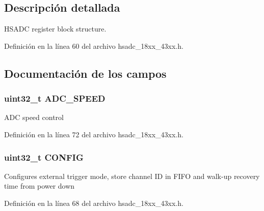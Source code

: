 \subsection{Descripción detallada}
H\+S\+A\+DC register block structure. 

Definición en la línea 60 del archivo hsadc\+\_\+18xx\+\_\+43xx.\+h.



\subsection{Documentación de los campos}
\subsubsection[{\texorpdfstring{A\+D\+C\+\_\+\+S\+P\+E\+ED}{ADC_SPEED}}]{ uint32\+\_\+t A\+D\+C\+\_\+\+S\+P\+E\+ED}\hypertarget{struct_l_p_c___h_s_a_d_c___t_a54d508ec691447ed4910f6bb5baf2caa}{}\label{struct_l_p_c___h_s_a_d_c___t_a54d508ec691447ed4910f6bb5baf2caa}
A\+DC speed control 

Definición en la línea 72 del archivo hsadc\+\_\+18xx\+\_\+43xx.\+h.

\subsubsection[{\texorpdfstring{C\+O\+N\+F\+IG}{CONFIG}}]{ uint32\+\_\+t C\+O\+N\+F\+IG}\hypertarget{struct_l_p_c___h_s_a_d_c___t_aed40378e2ce292435df51ff247d0cb78}{}\label{struct_l_p_c___h_s_a_d_c___t_aed40378e2ce292435df51ff247d0cb78}
Configures external trigger mode, store channel ID in F\+I\+FO and walk-\/up recovery time from power down 

Definición en la línea 68 del archivo hsadc\+\_\+18xx\+\_\+43xx.\+h.

